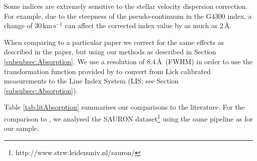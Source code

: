 			Some indices are extremely sensitive to the stellar velocity dispersion correction. For example, due to the steepness of the pseudo-continuum in the G4300 index, a change of $30 \, \mathrm{km\,s^{-1}}$ can affect the corrected index value by as much as 2\,\AA.

			When comparing to a particular paper we correct for the same effects as described in the paper, but using our methods as described in Section \ref{subsubsec:Absorption}. We use a resolution of 8.4\,\AA\ (FWHM) in order to use the transformation function provided by \citet{Vazdekis2010} to convert from Lick calibrated measurements to the Line Index System (LIS; see Section \ref{subsubsec:Absorption}). 

			Table \ref{tab:litAbsorption} summarises our comparisons to the literature. For the comparison to \citet{Vazdekis2010}, we analysed the SAURON dataset\footnote{http://www.strw.leidenuniv.nl/sauron/} \citep{Emsellem2004} using the same pipeline as for our sample. 


